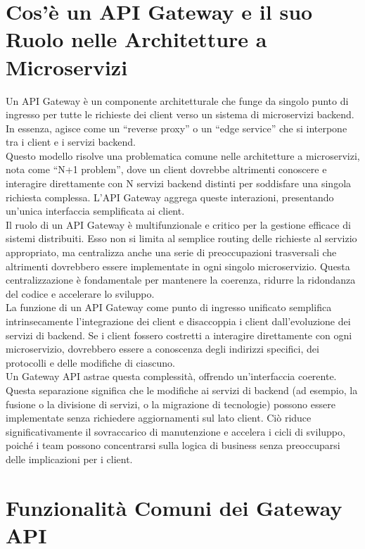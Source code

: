 \section{Cos'è un API Gateway e il suo Ruolo nelle Architetture a Microservizi}

Un API Gateway è un componente architetturale che funge da singolo punto di ingresso per tutte le richieste dei client verso un sistema di microservizi backend.
In essenza, agisce come un \enquote{reverse proxy} o un \enquote{edge service} che si interpone tra i client e i servizi backend. \\
Questo modello risolve una problematica comune nelle architetture a microservizi, nota come \enquote{N+1 problem}, dove un client dovrebbe altrimenti conoscere e interagire direttamente con N servizi backend distinti per soddisfare una singola richiesta complessa. 
L'API Gateway aggrega queste interazioni, presentando un'unica interfaccia semplificata ai client. \\

Il ruolo di un API Gateway è multifunzionale e critico per la gestione efficace di sistemi distribuiti.
Esso non si limita al semplice routing delle richieste al servizio appropriato, ma centralizza anche una serie di preoccupazioni trasversali che altrimenti dovrebbero essere implementate in ogni singolo microservizio.
Questa centralizzazione è fondamentale per mantenere la coerenza, ridurre la ridondanza del codice e accelerare lo sviluppo. \\

La funzione di un API Gateway come punto di ingresso unificato semplifica intrinsecamente l'integrazione dei client e disaccoppia i client dall'evoluzione dei servizi di backend.
Se i client fossero costretti a interagire direttamente con ogni microservizio, dovrebbero essere a conoscenza degli indirizzi specifici, dei protocolli e delle modifiche di ciascuno. \\
Un Gateway API astrae questa complessità, offrendo un'interfaccia coerente. Questa separazione significa che le modifiche ai servizi di backend (ad esempio, la fusione o la divisione di servizi, o la migrazione di tecnologie) possono essere implementate senza richiedere aggiornamenti sul lato client.
Ciò riduce significativamente il sovraccarico di manutenzione e accelera i cicli di sviluppo, poiché i team possono concentrarsi sulla logica di business senza preoccuparsi delle implicazioni per i client.

\section{Funzionalità Comuni dei Gateway API}

